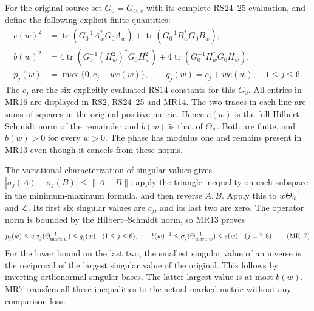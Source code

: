 For the original source set $G_0=G_{U,x}$ with its complete
RS24--25 evaluation, and define the following explicit finite
quantities:
\begin{equation}
 \begin{split}
 e(w)^2&=\operatorname{tr}(G_0^{-1}A_w^*G_0A_w)
            +\operatorname{tr}(G_0^{-1}B_w^*G_0B_w),\\
 b(w)^2&=4\operatorname{tr}(G_0^{-1}(H_w^2)^*G_0H_w^2)
            +4\operatorname{tr}(G_0^{-1}H_w^*G_0H_w),\\
 p_j(w)&=\max\{0,c_j-we(w)\},\qquad
 q_j(w)=c_j+we(w),\quad 1\le j\le6 .
 \end{split}\tag{MR16}
\end{equation}
The $c_j$ are the six explicitly evaluated RS14 constants
for this $G_0$. All entries in MR16 are displayed in
RS2, RS24--25 and MR14. The two traces in each line are
sums of squares in the original positive metric. Hence $e(w)$
is the full Hilbert--Schmidt norm of the remainder and $b(w)$
is that of $\Theta_w$. Both are finite, and $b(w)>0$ for
every $w>0$. The phase has modulus one and remains present
in MR13 even though it cancels from these norms.

The variational characterization of singular values gives
$|\sigma_j(A)-\sigma_j(B)|\le\|A-B\|$: apply the triangle
inequality on each subspace in the minimum-maximum formula,
and then reverse $A,B$. Apply this to $w\Theta_w^{-1}$ and
$\mathscr L$. Its first six singular values are $c_j$, and
its last two are zero. The operator norm is bounded by the
Hilbert--Schmidt norm, so MR13 proves
\begin{equation}
 p_j(w)\le w\sigma_j(\Theta_{{\rm mark},w}^{-1})\le q_j(w)
 \quad(1\le j\le6),\qquad
 b(w)^{-1}\le\sigma_j(\Theta_{{\rm mark},w}^{-1})\le e(w)
 \quad(j=7,8).
 \tag{MR17}
\end{equation}
For the lower bound on the last two, the smallest singular
value of an inverse is the reciprocal of the largest singular
value of the original. This follows by inverting orthonormal
singular bases. The latter largest value is at most $b(w)$.
MR7 transfers all these inequalities to the actual marked
metric without any comparison loss.

